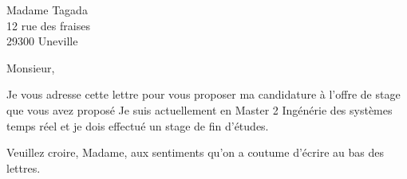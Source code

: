 \documentclass[11pt,origdate]{lettre}
\begin{document}
\begin{letter}{Madame Tagada\\ %
		           12 rue des fraises\\
		           29300 Uneville}
		\opening{Monsieur,}
		Je vous adresse cette lettre pour vous proposer ma candidature à l'offre de stage que vous avez proposé 
		Je suis actuellement en Master 2 Ingénérie des systèmes temps réel et je dois effectué un stage de fin d'études.
		\closing{Veuillez croire, Madame, aux sentiments qu'on a coutume d'écrire au bas des lettres.}
		
		
	\end{letter}
\end{document}
